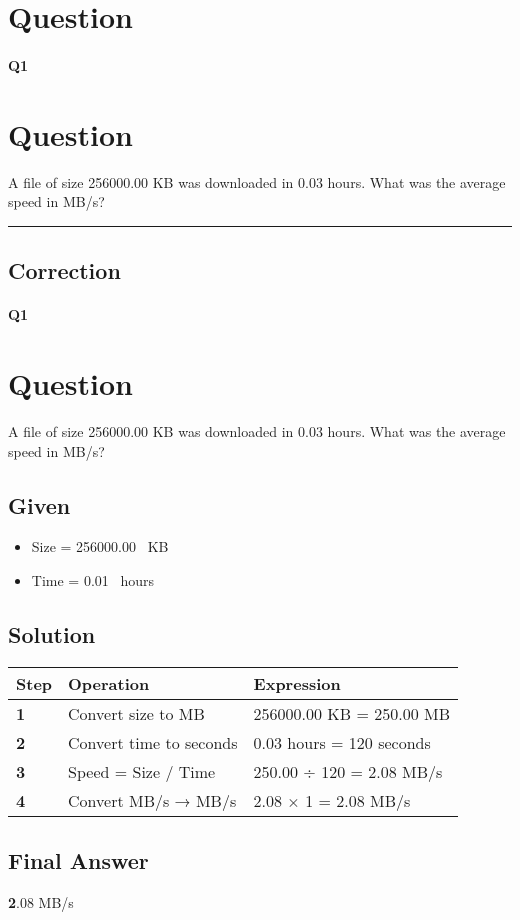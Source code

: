 
\section{Question}


\paragraph{Q1}

\section*{Question}
A file of size 256000.00 KB was downloaded in 0.03 hours. What was the average speed in MB/s?



\hrule width 1\linewidth
\pagebreak

\subsection{Correction}


\paragraph{Q1}

\section*{Question}
A file of size 256000.00 KB was downloaded in 0.03 hours. What was the average speed in MB/s?
\subsection*{Given}
\begin{itemize}
  \item Size = 256000.00 \, KB
  \item Time = 0.01 \, hours
\end{itemize}

\subsection*{Solution}
\begin{tabular}{>{\bfseries}p{1cm} p{4cm} p{8cm}}
\toprule
Step & Operation & Expression \\
\midrule
1 & Convert size to MB & 256000.00 KB = 250.00 MB \\
2 & Convert time to seconds & 0.03 hours = 120 seconds \\
3 & Speed = Size / Time & 250.00 ÷ 120 = 2.08 MB/s \\
4 & Convert MB/s → MB/s & 2.08 × 1 = 2.08 MB/s \\
\bottomrule
\end{tabular}

\subsection*{Final Answer}
\textbf2.08 MB/s

\pagebreak